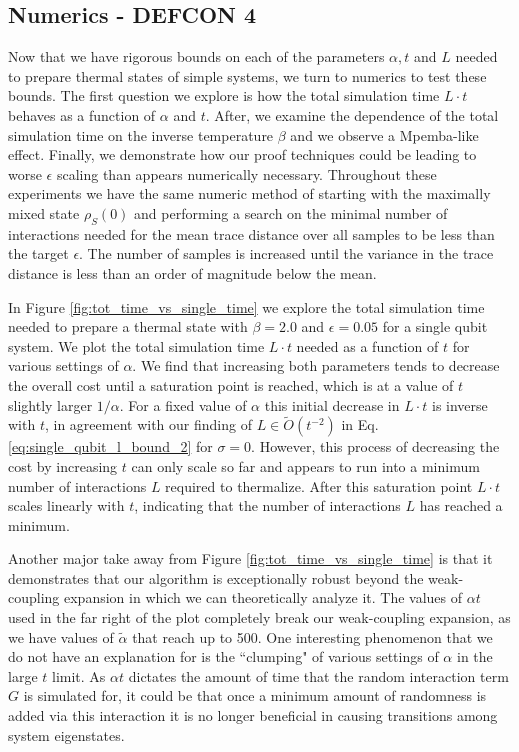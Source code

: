 \documentclass{article}
\newcommand{\bigotilde}[1]{\widetilde{O} \left( #1 \right)}
\begin{document}
\subsection{Numerics - DEFCON 4} \label{sec:specific_numerics}
Now that we have rigorous bounds on each of the parameters $\alpha, t$ and $L$ needed to prepare thermal states of simple systems, we turn to numerics to test these bounds. The first question we explore is how the total simulation time $L \cdot t$ behaves as a function of $\alpha$ and $t$. After, we examine the dependence of the total simulation time on the inverse temperature $\beta$ and we observe a Mpemba-like effect. Finally, we demonstrate how our proof techniques could be leading to worse $\epsilon$ scaling than appears numerically necessary. Throughout these experiments we have the same numeric method of starting with the maximally mixed state $\rho_S(0)$ and performing a search on the minimal number of interactions needed for the mean trace distance over all samples to be less than the target $\epsilon$. The number of samples is increased until the variance in the trace distance is less than an order of magnitude below the mean.

In Figure \ref{fig:tot_time_vs_single_time} we explore the total simulation time needed to prepare a thermal state with $\beta = 2.0$ and $\epsilon = 0.05$ for a single qubit system. We plot the total simulation time $L \cdot t$ needed as a function of $t$ for various settings of $\alpha$. We find that increasing both parameters tends to decrease the overall cost until a saturation point is reached, which is at a value of $t$ slightly larger $1/\alpha$. For a fixed value of $\alpha$ this initial decrease in $L \cdot t$ is inverse with $t$, in agreement with our finding of $L \in \bigotilde{t^{-2}}$ in Eq. \eqref{eq:single_qubit_l_bound_2} for $\sigma = 0$. However, this process of decreasing the cost by increasing $t$ can only scale so far and appears to run into a minimum number of interactions $L$ required to thermalize. After this saturation point $L \cdot t$ scales linearly with $t$, indicating that the number of interactions $L$ has reached a minimum. 

Another major take away from Figure \ref{fig:tot_time_vs_single_time} is that it demonstrates that our algorithm is exceptionally robust beyond the weak-coupling expansion in which we can theoretically analyze it. The values of $\alpha t$ used in the far right of the plot completely break our weak-coupling expansion, as we have values of $\widetilde{\alpha}$ that reach up to 500. One interesting phenomenon that we do not have an explanation for is the ``clumping" of various settings of $\alpha$ in the large $t$ limit. As $\alpha t$ dictates the amount of time that the random interaction term $G$ is simulated for, it could be that once a minimum amount of randomness is added via this interaction it is no longer beneficial in causing transitions among system eigenstates. 
\end{document}
